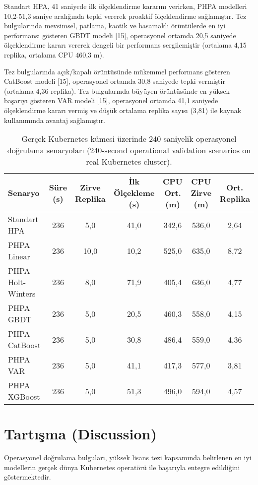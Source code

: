 \documentclass[12pt,a4paper]{article}
\begin{document}
Standart HPA, 41 saniyede ilk ölçeklendirme kararını verirken, PHPA modelleri 10,2-51,3 saniye aralığında tepki vererek proaktif ölçeklendirme sağlamıştır. Tez bulgularında mevsimsel, patlama, kaotik ve basamaklı örüntülerde en iyi performansı gösteren GBDT modeli [15], operasyonel ortamda 20,5 saniyede ölçeklendirme kararı vererek dengeli bir performans sergilemiştir (ortalama 4,15 replika, ortalama CPU 460,3 m).

Tez bulgularında açık/kapalı örüntüsünde mükemmel performans gösteren CatBoost modeli [15], operasyonel ortamda 30,8 saniyede tepki vermiştir (ortalama 4,36 replika). Tez bulgularında büyüyen örüntüsünde en yüksek başarıyı gösteren VAR modeli [15], operasyonel ortamda 41,1 saniyede ölçeklendirme kararı vermiş ve düşük ortalama replika sayısı (3,81) ile kaynak kullanımında avantaj sağlamıştır.

\begin{table}[h]
    \centering
    \caption{Gerçek Kubernetes kümesi üzerinde 240 saniyelik operasyonel doğrulama senaryoları (240-second operational validation scenarios on real Kubernetes cluster).}
    \label{tab:online}
    \begin{tabular}{@{}lcccccc@{}}
        \toprule
        Senaryo & Süre (s) & Zirve Replika & İlk Ölçekleme (s) & CPU Ort. (m) & CPU Zirve (m) & Ort. Replika \\
        \midrule
        Standart HPA & 236 & 5,0 & 41,0 & 342,6 & 536,0 & 2,64 \\
        PHPA Linear & 236 & 10,0 & 10,2 & 525,0 & 635,0 & 8,72 \\
        PHPA Holt-Winters & 236 & 8,0 & 71,9 & 405,4 & 636,0 & 4,77 \\
        PHPA GBDT & 236 & 5,0 & 20,5 & 460,3 & 558,0 & 4,15 \\
        PHPA CatBoost & 236 & 5,0 & 30,8 & 486,4 & 559,0 & 4,36 \\
        PHPA VAR & 236 & 5,0 & 41,1 & 417,3 & 577,0 & 3,81 \\
        PHPA XGBoost & 236 & 5,0 & 51,3 & 496,0 & 594,0 & 4,57 \\
        \bottomrule
    \end{tabular}
\end{table}

\section{Tartışma (Discussion)}

Operasyonel doğrulama bulguları, yüksek lisans tezi kapsamında belirlenen en iyi modellerin gerçek dünya Kubernetes operatörü ile başarıyla entegre edildiğini göstermektedir.
\end{document}
